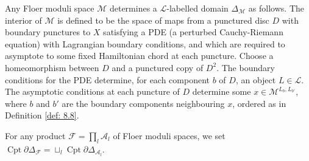\documentclass{TPmod}
\newcommand{\Cptd}{\operatorname{Cpt}\partial}
\newcommand{\cA}{\mathcal{A}}
\newcommand{\cF}{\mathcal{F}}
\newcommand{\cL}{\mathcal{L}}
\newcommand{\cM}{\mathcal{M}}
\numberwithin{equation}{section}
\begin{document}
    \begin{defn}
        Any Floer moduli space $\cM$ determines a $\cL$-labelled domain $\Delta_\cM$ as follows. The interior of $\cM$ is defined to be the space of maps from a punctured disc $D$ with boundary punctures to $X$ satisfying a PDE (a perturbed Cauchy-Riemann equation) with Lagrangian boundary conditions, and which are required to asymptote to some fixed Hamiltonian chord at each puncture. Choose a homeomorphism between $D$ and a punctured copy of $D^2$. The boundary conditions for the PDE determine, for each component $b$ of $D$, an object $L \in \cL$. The asymptotic conditions at each puncture of $D$ determine some $x \in \cM^{L_b, L_{b'}}$, where $b$ and $b'$ are the boundary components neighbouring $x$, ordered as in Definition \ref{def: 8.8}.  
        
        For any product $\cF = \prod_l \cA_l$ of Floer moduli spaces, we set $\Cptd\Delta_\cF = \sqcup_l\Cptd\Delta_{\cA_l}$.
    \end{defn}
\end{document}
